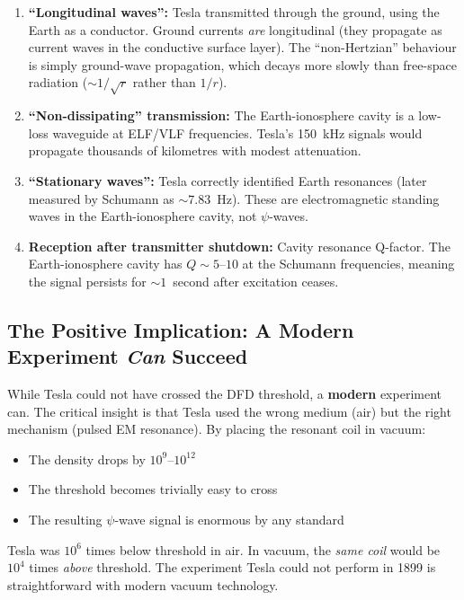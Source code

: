 \documentclass[11pt,a4paper]{article}
\begin{document}
\begin{enumerate}
\item \textbf{``Longitudinal waves'':} Tesla transmitted through the ground, using
  the Earth as a conductor. Ground currents \emph{are} longitudinal (they propagate
  as current waves in the conductive surface layer). The ``non-Hertzian'' behaviour
  is simply ground-wave propagation, which decays more slowly than free-space
  radiation ($\sim 1/\sqrt{r}$ rather than $1/r$).

\item \textbf{``Non-dissipating'' transmission:} The Earth-ionosphere cavity is a
  low-loss waveguide at ELF/VLF frequencies. Tesla's 150~kHz signals would
  propagate thousands of kilometres with modest attenuation.

\item \textbf{``Stationary waves'':} Tesla correctly identified Earth resonances
  (later measured by Schumann as $\sim 7.83$~Hz). These are electromagnetic
  standing waves in the Earth-ionosphere cavity, not $\psi$-waves.

\item \textbf{Reception after transmitter shutdown:} Cavity resonance Q-factor.
  The Earth-ionosphere cavity has $Q \sim 5$--$10$ at the Schumann frequencies,
  meaning the signal persists for $\sim 1$~second after excitation ceases.
\end{enumerate}

\subsection{The Positive Implication: A Modern Experiment \emph{Can} Succeed}

While Tesla could not have crossed the DFD threshold, a \textbf{modern} experiment
can. The critical insight is that Tesla used the wrong medium (air) but the
right mechanism (pulsed EM resonance). By placing the resonant coil in vacuum:
\begin{itemize}
\item The density drops by $10^9$--$10^{12}$
\item The threshold becomes trivially easy to cross
\item The resulting $\psi$-wave signal is enormous by any standard
\end{itemize}

Tesla was $10^6$ times below threshold in air. In vacuum, the \emph{same coil}
would be $10^4$ times \emph{above} threshold. The experiment Tesla could not
perform in 1899 is straightforward with modern vacuum technology.
\end{document}
